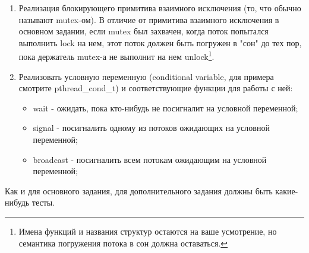 \begin{enumerate}
  \item Реализация блокирующего примитива взаимного исключения (то, что обычно
        называют mutex-ом). В отличие от примитива взаимного исключения в
        основном задании, если mutex был захвачен, когда поток попытался
        выполнить lock на нем, этот поток должен быть погружен в "сон" до тех
        пор, пока держатель mutex-а не выполнит на нем unlock\footnote{Имена
        функций и названия структур остаются на ваше усмотрение, но семантика
        погружения потока в сон должна оставаться.}.
  \item Реализовать условную переменную (conditional variable, для примера
        смотрите pthread\_cond\_t) и соответствующие функции для работы с ней:
    \begin{itemize}
      \item wait - ожидать, пока кто-нибудь не посигналит на условной
            переменной;
      \item signal - посигналить одному из потоков ожидающих на условной
            переменной;
      \item broadcast - посигналить всем потокам ожидающим на условной
            переменной;
    \end{itemize}
\end{enumerate}

Как и для основного задания, для дополнительного задания должны быть
какие-нибудь тесты.

